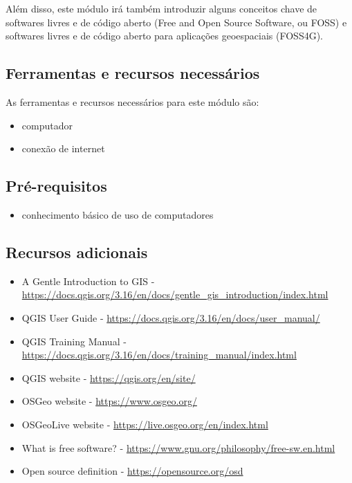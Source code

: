 \documentclass[
]{book}
\providecommand{\tightlist}{%
  \setlength{\itemsep}{0pt}\setlength{\parskip}{0pt}}
\begin{document}
Além disso, este módulo irá também introduzir alguns conceitos chave de softwares livres e de código aberto (Free and Open Source Software, ou FOSS) e softwares livres e de código aberto para aplicações geoespaciais (FOSS4G).

\hypertarget{ferramentas-e-recursos-necessuxe1rios}{%
\subsection{Ferramentas e recursos necessários}\label{ferramentas-e-recursos-necessuxe1rios}}

As ferramentas e recursos necessários para este módulo são:

\begin{itemize}
\tightlist
\item
  computador
\item
  conexão de internet
\end{itemize}

\hypertarget{pruxe9-requisitos}{%
\subsection{Pré-requisitos}\label{pruxe9-requisitos}}

\begin{itemize}
\tightlist
\item
  conhecimento básico de uso de computadores
\end{itemize}

\hypertarget{recursos-adicionais}{%
\subsection{Recursos adicionais}\label{recursos-adicionais}}

\begin{itemize}
\tightlist
\item
  A Gentle Introduction to GIS - \url{https://docs.qgis.org/3.16/en/docs/gentle_gis_introduction/index.html}
\item
  QGIS User Guide - \url{https://docs.qgis.org/3.16/en/docs/user_manual/}
\item
  QGIS Training Manual - \url{https://docs.qgis.org/3.16/en/docs/training_manual/index.html}
\item
  QGIS website - \url{https://qgis.org/en/site/}
\item
  OSGeo website - \url{https://www.osgeo.org/}
\item
  OSGeoLive website - \url{https://live.osgeo.org/en/index.html}
\item
  What is free software? - \url{https://www.gnu.org/philosophy/free-sw.en.html}
\item
  Open source definition - \url{https://opensource.org/osd}
\end{itemize}
\end{document}
